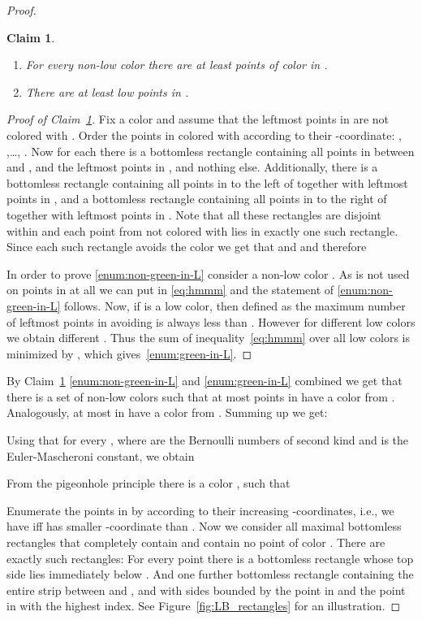 \documentclass[11pt,a4paper]{amsart}
\newenvironment{enumeratei}{\begin{enumerate}[label=\textup{(\roman*)}, noitemsep, topsep=1.5mm, labelindent=.8em, leftmargin=*, widest=.]}{\end{enumerate}}
\theoremstyle{plain}
\newtheorem{claim}[theorem]{Claim}
\theoremstyle{definition}
\begin{document}
\begin{proof}
\begin{claim}\label{claim:green-colors}
\hfill
\begin{enumeratei}
  \item For every non-low color  there are at least  points of color  in .\label{enum:non-green-in-L}
  \item There are at least  low points in .\label{enum:green-in-L}
 \end{enumeratei}
\end{claim}
\begin{proof}[Proof of Claim~\ref{claim:green-colors}]
Fix a color  and assume that the  leftmost points in  are not colored with . 
Order the points in  colored with  according to their -coordinate: , ,\ldots, . 
Now for each  there is a bottomless rectangle containing all points in  between  and , and the leftmost  points in , and nothing else. 
Additionally, there is a bottomless rectangle containing all points in  to the left of  together with  leftmost points in , and a bottomless rectangle containing all points in  to the right of  together with  leftmost points in . 
Note that all these rectangles are disjoint within  and each point from  not colored with  lies in exactly one such rectangle.
Since each such rectangle  avoids the color  we get that  and  and therefore


In order to prove \ref{enum:non-green-in-L} consider a non-low color . 
As  is not used on points in  at all we can put  in \eqref{eq:hmmm} and the statement of \ref{enum:non-green-in-L} follows. 
Now, if  is a low color, then  defined as the maximum number of leftmost points in  avoiding  is always less than .
However for different low colors  we obtain different .
Thus the sum of inequality~\eqref{eq:hmmm} over all low colors is minimized by , which gives~\ref{enum:green-in-L}.
\end{proof}

By Claim~\ref{claim:green-colors} \ref{enum:non-green-in-L} and \ref{enum:green-in-L} combined we get that there is a set  of  non-low colors such that at most  points in  have a color from .
Analogously, at most  in  have a color from .
Summing up we get:

Using that  for every , 
where  are the Bernoulli numbers of second kind and  is the Euler-Mascheroni constant, we obtain

From the pigeonhole principle there is a color , such that

Enumerate the points in  by  according to their increasing -coordinates, i.e., we have  if{f}  has smaller -coordinate than .
Now we consider all maximal bottomless rectangles that completely contain  and contain no point of color .
There are exactly  such rectangles:
For every point  there is a bottomless rectangle  whose top side lies immediately below .
And one further bottomless rectangle  containing the entire strip between  and , and with sides bounded by the point in  and the point in  with the highest index. See Figure~\ref{fig:LB_rectangles} for an illustration.


\end{proof}
\end{document}
